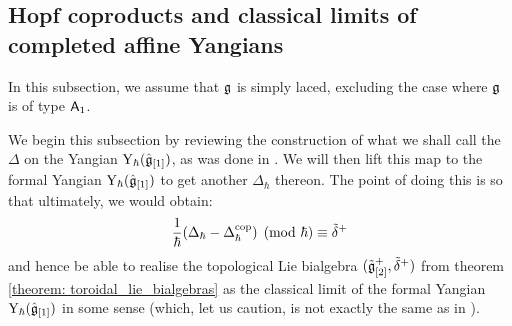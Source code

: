     \subsection{Hopf coproducts and classical limits of completed affine Yangians}
        \begin{convention}
            In this subsection, we assume that $\mathfrak{g}$ is simply laced, excluding the case where $\mathfrak{g}$ is of type $\mathsf{A}_1$. 
        \end{convention}

        We begin this subsection by reviewing the construction of what we shall call the  $\Delta$ on the Yangian $\mathrm{Y}_{\hbar}(\hat{\mathfrak{g}}_{[1]})$, as was done in \cite[Sections 4 and 5]{guay_nakajima_wendlandt_affine_yangian_coproduct}. We will then lift this map to the formal Yangian $\mathrm{Y}_{\hbar}(\hat{\mathfrak{g}}_{[1]})$ to get another  $\Delta_{\hbar}$ thereon. The point of doing this is so that ultimately, we would obtain:
            $$\frac{1}{\hbar}(\Delta_{\hbar} - \Delta_{\hbar}^{\mathrm{cop}}) \pmod{\hbar} \equiv \tilde{\delta}^+$$
        and hence be able to realise the topological Lie bialgebra $(\tilde{\mathfrak{g}}_{[2]}^+, \tilde{\delta}^+)$ from theorem \ref{theorem: toroidal_lie_bialgebras} as the classical limit of the formal Yangian $\mathrm{Y}_{\hbar}(\hat{\mathfrak{g}}_{[1]})$ in some sense (which, let us caution, is not exactly the same as in \cite{etingof_kazhdan_quantisation_1}).
        
